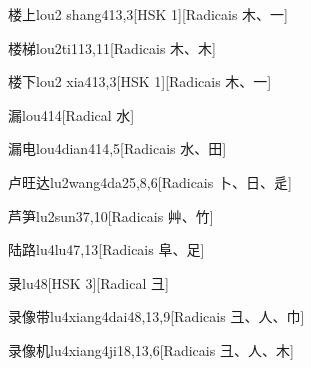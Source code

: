\begin{entry}{楼上}{lou2 shang4}{13,3}[HSK 1][Radicais ⽊、⼀]
\end{entry}

\begin{entry}{楼梯}{lou2ti1}{13,11}[Radicais ⽊、⽊]
\end{entry}

\begin{entry}{楼下}{lou2 xia4}{13,3}[HSK 1][Radicais ⽊、⼀]
\end{entry}

\begin{entry}{漏}{lou4}{14}[Radical ⽔]
\end{entry}

\begin{entry}{漏电}{lou4dian4}{14,5}[Radicais ⽔、⽥]
\end{entry}

\begin{entry}{卢旺达}{lu2wang4da2}{5,8,6}[Radicais ⼘、⽇、⾡]
\end{entry}

\begin{entry}{芦笋}{lu2sun3}{7,10}[Radicais ⾋、⽵]
\end{entry}

\begin{entry}{陆路}{lu4lu4}{7,13}[Radicais ⾩、⾜]
\end{entry}

\begin{entry}{录}{lu4}{8}[HSK 3][Radical ⼹]
\end{entry}

\begin{entry}{录像带}{lu4xiang4dai4}{8,13,9}[Radicais ⼹、⼈、⼱]
\end{entry}

\begin{entry}{录像机}{lu4xiang4ji1}{8,13,6}[Radicais ⼹、⼈、⽊]
\end{entry}

